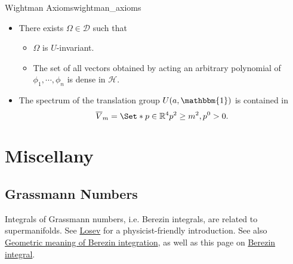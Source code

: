 \documentclass{article}
\begin{document}
\begin{definition}{Wightman Axioms}{wightman_axioms}
\begin{itemize}
        \item There exists $\Omega \in \mathcal{D}$ such that
        \begin{itemize}
            \item $\Omega$ is $U$-invariant.
            \item The set of all vectors obtained by acting an arbitrary polynomial of $\phi_1,\cdots,\phi_n$ is dense in $\mathcal{H}$.
        \end{itemize}
        \item The spectrum of the translation group $U(a,\mathbbm{1})$ is contained in
        \[ \overline{V}_m = \Set*{p\in \mathbb{R}^4}{p^2 \ge m^2, p^0 > 0}. \]
    \end{itemize}
\end{definition}

\section{Miscellany}

\subsection{Grassmann Numbers}

Integrals of Grassmann numbers, i.e. Berezin integrals, are related to supermanifolds.
See \href{ref/Losev-Berezin-Integral.pdf}{Losev} for a physicist-friendly introduction.
See also \href{https://math.stackexchange.com/questions/1449312/geometric-meaning-of-berezin-integration}{Geometric meaning of Berezin integration},
as well as this page on \href{https://ncatlab.org/nlab/show/Berezin+integral}{Berezin integral}.



\end{document}
